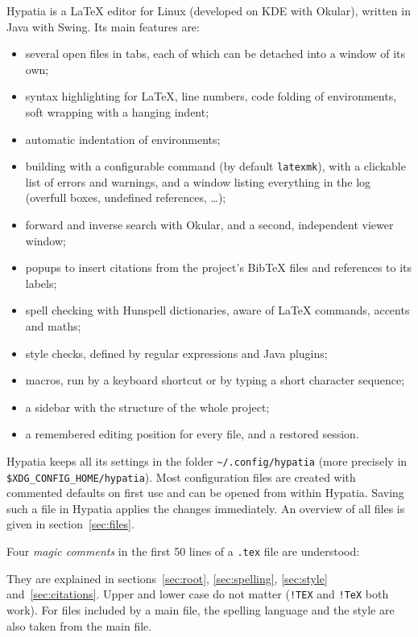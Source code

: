 \documentclass[11pt]{article}
\newcommand{\file}[1]{\texttt{#1}}
\newcommand{\cfgdir}{\texttt{\textasciitilde/.config/hypatia}}
\begin{document}
    Hypatia is a LaTeX editor for Linux (developed on KDE with Okular), written in Java with Swing. Its main features are:
    \begin{itemize}
        \itemsep-1mm
        \item several open files in tabs, each of which can be detached into a window of its own;
        \item syntax highlighting for LaTeX, line numbers, code folding of environments, soft wrapping with a hanging indent;
        \item automatic indentation of environments;
        \item building with a configurable command (by default \verb+latexmk+), with a clickable list of errors and warnings, and a window listing everything in the log (overfull boxes, undefined references, \ldots);
        \item forward and inverse search with Okular, and a second, independent viewer window;
        \item popups to insert citations from the project's BibTeX files and references to its labels;
        \item spell checking with Hunspell dictionaries, aware of LaTeX commands, accents and maths;
        \item style checks, defined by regular expressions and Java plugins;
        \item macros, run by a keyboard shortcut or by typing a short character sequence;
        \item a sidebar with the structure of the whole project;
        \item a remembered editing position for every file, and a restored session.
    \end{itemize}

    Hypatia keeps all its settings in the folder \cfgdir{} (more precisely in \verb+$XDG_CONFIG_HOME/hypatia+). Most configuration files are created with commented defaults on first use and can be opened from within Hypatia. Saving such a file in Hypatia applies the changes immediately. An overview of all files is given in section~\ref{sec:files}.

    Four \emph{magic comments} in the first 50 lines of a \file{.tex} file are understood:
    \begin{Code}
    \end{Code}
    They are explained in sections~\ref{sec:root}, \ref{sec:spelling}, \ref{sec:style} and~\ref{sec:citations}.
    Upper and lower case do not matter (\verb+!TEX+ and \verb+!TeX+ both work). For files included by a main file, the spelling language and the style are also taken from the main file.
\end{document}

